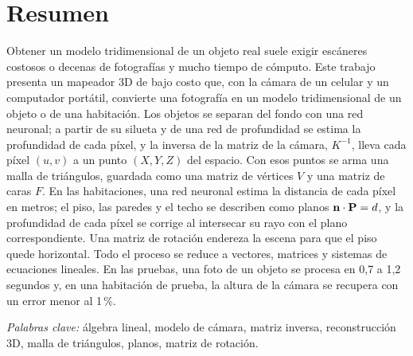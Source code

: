 \newpage
\section*{Resumen}

Obtener un modelo tridimensional de un objeto real suele exigir escáneres
costosos o decenas de fotografías y mucho tiempo de cómputo. Este trabajo
presenta un mapeador 3D de bajo costo que, con la cámara de un celular y un
computador portátil, convierte una fotografía en un modelo tridimensional de un
objeto o de una habitación. Los objetos se separan del fondo con una red
neuronal; a partir de su silueta y de una red de profundidad se estima la
profundidad de cada píxel, y la inversa de la matriz de la cámara, $K^{-1}$, lleva cada píxel
$(u,v)$ a un punto $(X,Y,Z)$ del espacio. Con esos puntos se arma una malla de
triángulos, guardada como una matriz de vértices $V$ y una matriz de caras $F$.
En las habitaciones, una red neuronal estima la distancia de cada píxel en
metros; el piso, las paredes y el techo se describen como planos
$\mathbf{n}\cdot\mathbf{P}=d$, y la profundidad de cada píxel se corrige al
intersecar su rayo con el plano correspondiente. Una matriz de rotación
endereza la escena para que el piso quede horizontal. Todo el proceso se
reduce a vectores, matrices y sistemas de ecuaciones lineales. En las pruebas,
una foto de un objeto se procesa en 0,7 a 1,2 segundos y, en una habitación de
prueba, la altura de la cámara se recupera con un error menor al 1\,\%.

\textit{Palabras clave:} álgebra lineal, modelo de cámara, matriz inversa,
reconstrucción 3D, malla de triángulos, planos, matriz de rotación.
